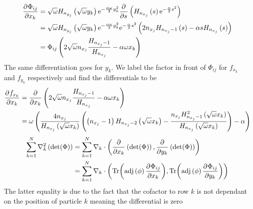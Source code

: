 \documentclass[a4paper, hidelinks, 10pt]{article}\usepackage[utf8]{inputenc}
\newcommand{\me}{\mathrm{e}} %
\newcommand{\suml}[2]{\sum\limits_{#1=1}^{#2}}
\newcommand{\adj}[1]{\text{adj}\left(#1\right)}
\begin{document}
        \begin{align}
            \prd{x_k}[\Phi_{ij}] &= \sqrt{\omega}
            H_{n_{y_j}}\left(\sqrt{\omega}y_k\right)
            \me^{-\frac{\alpha\omega}{2}y^2_k}
            \prd{s}\left(H_{n_{x_j}}\left(s\right)
            \me^{-\frac{\alpha}{2}s^2}\right) \nonumber \\
            &= \sqrt{\omega} H_{n_{y_j}}\left(\sqrt{\omega}y_k\right)
            \me^{-\frac{\alpha\omega}{2}y^2_k} \me^{-\frac{\alpha}{2}s^2}
            \left(2n_{x_j}H_{n_{x_j}-1}\left(s\right) -\alpha
            sH_{n_{x_j}}\left(s\right)\right) \nonumber \\
            &= \Phi_{ij}\left(2\sqrt{\omega}n_{x_j}
            \frac{H_{n_{x_j}-1}}{H_{n_{x_j}}} - \alpha\omega x_k\right)
            \nonumber \\
            \label{eq:Phisingleder}
        \end{align}
    The same differentiation goes for $y_k$. We label the factor in front of
    $\Phi_{ij}$ for $f_{x_k}$ and $f_{y_k}$ respectively and find the
    differentials to be
        \begin{align}
            \prd{x_k}[f_{x_k}] &= \prd{x_k} \left(2\sqrt{\omega}n_{x_j}
            \frac{H_{n_{x_j}-1}}{H_{n_{x_j}}} - \alpha\omega x_k\right)
            \nonumber \\
            &= \omega\left(\frac{4n_{x_j}}
            {H_{n_{x_j}}\left(\sqrt{\omega}x_k\right)}
            \left(\left(n_{x_j}-1\right)H_{n_{x_j}-2}
            \left(\sqrt{\omega}x_k\right) -
            \frac{n_{x_j}H^2_{n_{x_j}-1}\left(\sqrt{\omega}x_k\right)}
            {H_{n_{x_j}}\left(\sqrt{\omega}x_k\right)}\right) - \alpha\right)
            \nonumber \\
            \label{eq:Phisinglederf}
        \end{align}
        \begin{align}
            \suml{k}{N}\nabla^2_k \left(\det(\Phi)\right) &= \suml{k}{N}
            \nabla_k\cdot\left(\prd{x_k}\left(\det(\Phi)\right),
            \prd{y_k}\left(\det(\Phi)\right)\right) \nonumber \\
            &= \suml{k}{N} \nabla_k \cdot
            \left(\Tr(\adj{\phi}\prd{x_k}[\Phi_{ij}]),
            \Tr(\adj{\phi}\prd{y_k}[\Phi_{ij}])\right)
            \label{eq:PhiLapexp}
        \end{align}
    The latter equality is due to the fact that the cofactor to row $k$ is not
    dependant on the position of particle $k$ meaning the differential is zero
\end{document}
